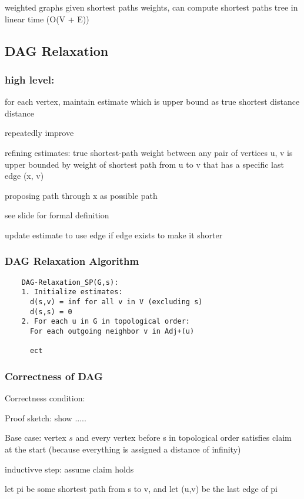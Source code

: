 \documentclass{article}
\begin{document}
weighted graphs
given shortest paths weights, can compute shortest paths tree in linear time (O(V + E))



\subsection{DAG Relaxation}
\subsubsection{high level: }

for each vertex, maintain estimate which is upper bound as true shortest distance distance

repeatedly improve

refining estimates: true shortest-path weight between any pair of vertices u, v is upper bounded by 
weight of shortest path from u to v that has a specific last edge (x, v)

proposing path through x as possible path


see slide for formal definition

update estimate to use edge if edge exists to make it shorter

\subsubsection{DAG Relaxation Algorithm}
\begin{verbatim}
    DAG-Relaxation_SP(G,s):
    1. Initialize estimates:
      d(s,v) = inf for all v in V (excluding s)
      d(s,s) = 0
    2. For each u in G in topological order:
      For each outgoing neighbor v in Adj+(u)

      ect
\end{verbatim}

\subsubsection{Correctness of DAG}
Correctness condition:

Proof sketch: show .....

Base case: vertex $s$ and every vertex before s in topological order satisfies claim at the start
(because everything is assigned a distance of infinity)

inductivve step: assume claim holds

let pi be some shortest path from s to v, and let (u,v) be the last edge of pi
\end{document}

